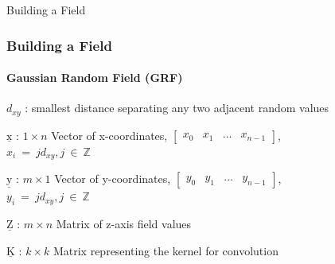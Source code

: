 \documentclass[professionalfont,10pt]{beamer}
\begin{document}
	\begin{frame}[t]{Building a Field}
		\frametitle{Building a Field}
		\framesubtitle{Gaussian Random Field (GRF)}
		\hskip-0.75cm
		\begin{minipage}[t]{0.2\linewidth}\vspace{-0.5cm}
			\tiny\tableofcontents[currentsection,currentsubsection,hideothersubsections,subsectionstyle=show/shaded]
		\end{minipage}
		\hfill%
		\begin{minipage}[t]{0.86\linewidth}\vspace{-0.5cm}
			\begin{flushleft}
				$d_{xy}$ : smallest distance separating any two adjacent random values 
				
				$\underline{\text{x}}$ : $1 \times n$ Vector of x-coordinates, $\left[\begin{array}{cccc}x_0 & x_1 & \dots & x_{n-1}\end{array}\right]$,\\
				$ x_i~=~jd_{xy}, j~\in~\mathbb{Z}$
				
				$\underline{\text{y}}$ : $m \times 1$ Vector of y-coordinates, $\left[\begin{array}{cccc}y_0 & y_1 & \dots & y_{n-1}\end{array}\right]$,\\
				$ y_i~=~jd_{xy}, j~\in~\mathbb{Z}$

				
				$\underline{\text{Z}}$ : $m \times n$ Matrix of z-axis field values 
				
				$\underline{\text{K}}$ : $k \times k$ Matrix representing the kernel for convolution
	
			\end{flushleft}
		\end{minipage}
		\vfill%
	\end{frame}
	
\end{document}
